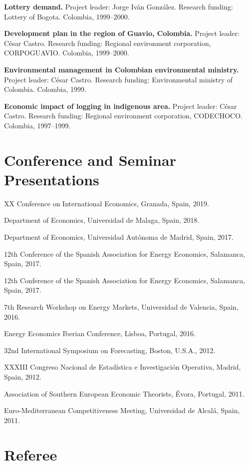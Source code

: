 \documentclass[11pt]{article}\usepackage[]{graphicx}\usepackage[]{color}
\begin{document}
 \textbf{Lottery demand.} Project leader: Jorge Iván González. Research funding: Lottery of Bogota. Colombia, 1999--2000.

 \textbf{Development plan in the region of Guavio, Colombia.} Project leader: César Castro. Research funding: Regional environment corporation, CORPOGUAVIO. Colombia, 1999--2000.

 \textbf{Environmental management in Colombian environmental ministry.} Project leader: César Castro. Research funding: Environmental ministry of Colombia. Colombia, 1999.

 \textbf{Economic impact of logging in indigenous area.} Project leader: César Castro. Research funding: Regional environment corporation, CODECHOCO. Colombia, 1997--1999.


\section{Conference and Seminar Presentations} 

 XX Conference on International Economics, Granada, Spain, 2019.
 
 Department of Economics, Universidad de Malaga, Spain, 2018.
 
 Department of Economics, Universidad Autónoma de Madrid, Spain, 2017.
 
 12th Conference of the Spanish Association for Energy Economics, Salamanca, Spain, 2017.
 
 12th Conference of the Spanish Association for Energy Economics, Salamanca, Spain, 2017.
 
 7th Research Workshop on Energy Markets, Universidad de Valencia, Spain, 2016.
 
 Energy Economics Iberian Conference, Lisboa, Portugal, 2016.
 
 32nd International Symposium on Forecasting, Boston, U.S.A., 2012.

 XXXIII Congreso Nacional de Estadística e Investigación Operativa, Madrid, Spain, 2012.
 
 Association of Southern European Economic Theorists, Évora, Portugal, 2011.

 Euro-Mediterranean Competitiveness Meeting, Universidad de Alcalá, Spain, 2011.


\section{Referee} 
\end{document}
